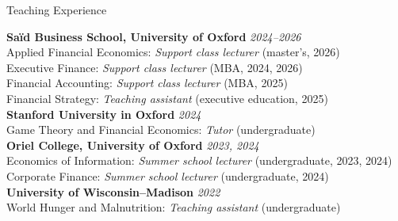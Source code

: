 \documentclass{resume} %
\begin{document}
%
%


\begin{rSection}{Teaching Experience}

{\bf Sa\"{i}d Business School, University of Oxford} \hfill {\em 2024--2026} \\
	Applied Financial Economics: \textit{Support class lecturer} (master's, 2026) \\
	Executive Finance: \textit{Support class lecturer} (MBA, 2024, 2026) \\
	Financial Accounting: \textit{Support class lecturer} (MBA, 2025) \\
	Financial Strategy: \textit{Teaching assistant} (executive education, 2025) \\
{\bf Stanford University in Oxford} \hfill {\em 2024} \\
	Game Theory and Financial Economics: \textit{Tutor} (undergraduate) \\
{\bf Oriel College, University of Oxford} \hfill {\em 2023, 2024} \\
	Economics of Information: \textit{Summer school lecturer} (undergraduate, 2023, 2024) \\
	Corporate Finance: \textit{Summer school lecturer} (undergraduate, 2024) \\
{\bf University of Wisconsin--Madison} \hfill {\em 2022} \\
	World Hunger and Malnutrition: \textit{Teaching assistant} (undergraduate)

\end{rSection}

\end{document}

